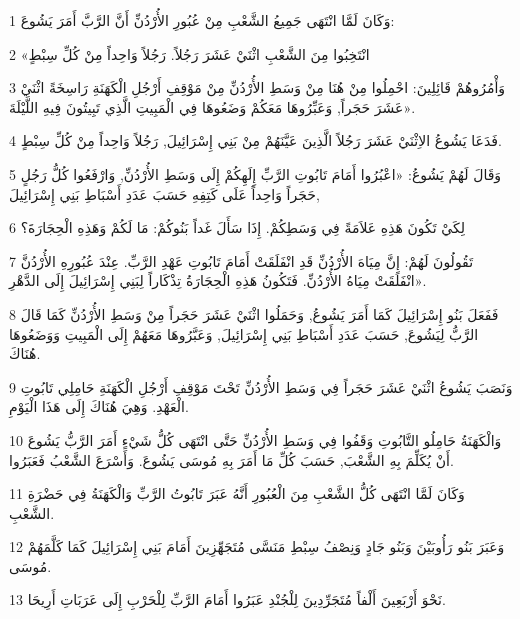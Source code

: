 \par 1 وَكَانَ لَمَّا انْتَهَى جَمِيعُ الشَّعْبِ مِنْ عُبُورِ الأُرْدُنِّ أَنَّ الرَّبَّ أَمَرَ يَشُوعَ:
\par 2 «انْتَخِبُوا مِنَ الشَّعْبِ اثْنَيْ عَشَرَ رَجُلاً. رَجُلاً وَاحِداً مِنْ كُلِّ سِبْطٍ
\par 3 وَأْمُرُوهُمْ قَائِلِينَ: احْمِلُوا مِنْ هُنَا مِنْ وَسَطِ الأُرْدُنِّ مِنْ مَوْقِفِ أَرْجُلِ الْكَهَنَةِ رَاسِخَةً اثْنَيْ عَشَرَ حَجَراً, وَعَبِّرُوهَا مَعَكُمْ وَضَعُوهَا فِي الْمَبِيتِ الَّذِي تَبِيتُونَ فِيهِ اللَّيْلَةَ».
\par 4 فَدَعَا يَشُوعُ الاِثْنَيْ عَشَرَ رَجُلاً الَّذِينَ عَيَّنَهُمْ مِنْ بَنِي إِسْرَائِيلَ, رَجُلاً وَاحِداً مِنْ كُلِّ سِبْطٍ.
\par 5 وَقَالَ لَهُمْ يَشُوعُ: «اعْبُرُوا أَمَامَ تَابُوتِ الرَّبِّ إِلَهِكُمْ إِلَى وَسَطِ الأُرْدُنِّ, وَارْفَعُوا كُلُّ رَجُلٍ حَجَراً وَاحِداً عَلَى كَتِفِهِ حَسَبَ عَدَدِ أَسْبَاطِ بَنِي إِسْرَائِيلَ,
\par 6 لِكَيْ تَكُونَ هَذِهِ عَلاَمَةً فِي وَسَطِكُمْ. إِذَا سَأَلَ غَداً بَنُوكُمْ: مَا لَكُمْ وَهَذِهِ الْحِجَارَةَ؟
\par 7 تَقُولُونَ لَهُمْ: إِنَّ مِيَاهَ الأُرْدُنِّ قَدِ انْفَلَقَتْ أَمَامَ تَابُوتِ عَهْدِ الرَّبِّ. عِنْدَ عُبُورِهِ الأُرْدُنَّ انْفَلَقَتْ مِيَاهُ الأُرْدُنِّ. فَتَكُونُ هَذِهِ الْحِجَارَةُ تِذْكَاراً لِبَنِي إِسْرَائِيلَ إِلَى الدَّهْرِ».
\par 8 فَفَعَلَ بَنُو إِسْرَائِيلَ كَمَا أَمَرَ يَشُوعُ, وَحَمَلُوا اثْنَيْ عَشَرَ حَجَراً مِنْ وَسَطِ الأُرْدُنِّ كَمَا قَالَ الرَّبُّ لِيَشُوعَ, حَسَبَ عَدَدِ أَسْبَاطِ بَنِي إِسْرَائِيلَ, وَعَبَّرُوهَا مَعَهُمْ إِلَى الْمَبِيتِ وَوَضَعُوهَا هُنَاكَ.
\par 9 وَنَصَبَ يَشُوعُ اثْنَيْ عَشَرَ حَجَراً فِي وَسَطِ الأُرْدُنِّ تَحْتَ مَوْقِفِ أَرْجُلِ الْكَهَنَةِ حَامِلِي تَابُوتِ الْعَهْدِ. وَهِيَ هُنَاكَ إِلَى هَذَا الْيَوْمِ.
\par 10 وَالْكَهَنَةُ حَامِلُو التَّابُوتِ وَقَفُوا فِي وَسَطِ الأُرْدُنِّ حَتَّى انْتَهَى كُلُّ شَيْءٍ أَمَرَ الرَّبُّ يَشُوعَ أَنْ يُكَلِّمَ بِهِ الشَّعْبَ, حَسَبَ كُلِّ مَا أَمَرَ بِهِ مُوسَى يَشُوعَ. وَأَسْرَعَ الشَّعْبُ فَعَبَرُوا.
\par 11 وَكَانَ لَمَّا انْتَهَى كُلُّ الشَّعْبِ مِنَ الْعُبُورِ أَنَّهُ عَبَرَ تَابُوتُ الرَّبِّ وَالْكَهَنَةُ فِي حَضْرَةِ الشَّعْبِ.
\par 12 وَعَبَرَ بَنُو رَأُوبَيْنَ وَبَنُو جَادٍ وَنِصْفُ سِبْطِ مَنَسَّى مُتَجَهِّزِينَ أَمَامَ بَنِي إِسْرَائِيلَ كَمَا كَلَّمَهُمْ مُوسَى.
\par 13 نَحْوَ أَرْبَعِينَ أَلْفاً مُتَجَرِّدِينَ لِلْجُنْدِ عَبَرُوا أَمَامَ الرَّبِّ لِلْحَرْبِ إِلَى عَرَبَاتِ أَرِيحَا.
